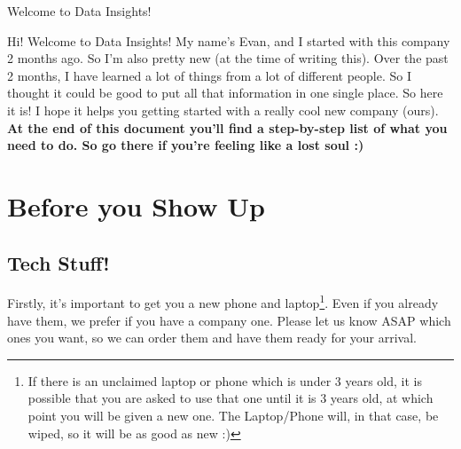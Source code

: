 \documentclass[11pt]{report}
\begin{document}
\begin{centering}
\Large Welcome to Data Insights!\\
\end{centering}
\vspace{2cm}

Hi! Welcome to Data Insights! My name's Evan, and I started with this company 2 months ago. So I'm also pretty new (at the time of writing this). Over the past 2 months, I have learned a lot of things from a lot of different people. So I thought it could be good to put all that information in one single place. So here it is! I hope it helps you getting started with a really cool new company (ours).\\

\noindent\textbf{At the end of this document you'll find a step-by-step list of what you need to do. So go there if you're feeling like a lost soul :)}

\tableofcontents

\chapter{Before you Show Up}

\section{Tech Stuff!}
\label{TechStuff}
Firstly, it's important to get you a new phone and laptop\footnote{If there is an unclaimed laptop or phone which is under 3 years old, it is possible that you are asked to use that one until it is 3 years old, at which point you will be given a new one. The Laptop/Phone will, in that case, be wiped, so it will be as good as new :)}. Even if you already have them, we prefer if you have a company one. Please let us know ASAP which ones you want, so we can order them and have them ready for your arrival.
\end{document}
